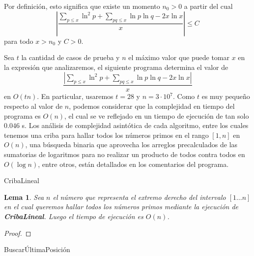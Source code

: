 \documentclass{article}
\DeclarePairedDelimiter\floor{\lfloor}{\rfloor}
\newtheorem{lemma}[theorem]{Lema}
\theoremstyle{definition}
\theoremstyle{remark}
\begin{document}
Por definici\'on, esto significa que existe un momento $n_0 > 0$ a partir del cual
$$\left|\frac{\sum_{p \leq x} \ln^2 p + \sum_{pq \leq x} \ln p \ln q - 2x\ln x}{x}\right| \leq C$$
para todo $x > n_0$ y $C > 0$.

Sea $t$ la cantidad de casos de prueba y $n$ el m\'aximo valor que puede tomar $x$ en la expresi\'on que analizaremos,
el siguiente programa determina el valor de 
$$\frac{|\sum_{p \leq x} \ln^2 p + \sum_{pq \leq x} \ln p \ln q - 2x\ln x|}{x}$$
en $O(tn)$. En particular, usaremos $t = 28$ y $n = 3 \cdot 10^7$. Como $t$ es muy peque\~no respecto al valor de $n$, podemos
considerar que la complejidad en tiempo del programa es $O(n)$, el cual se ve reflejado en un tiempo de ejecuci\'on
de tan solo $0.046$ s. Los an\'alisis de complejidad asint\'otica de cada algoritmo, entre los cuales tenemos una criba para
hallar todos los n\'umeros primos en el rango $[1, n]$ en $O(n)$, una b\'usqueda binaria que aprovecha los arreglos precalculados de las sumatorias
de logaritmos para no realizar un producto de todos contra todos en $O(\log n)$, entre otros, est\'an detallados en los comentarios del programa.

\begin{algorithm}[H]
\SetAlgoLined
\DontPrintSemicolon
{}
\caption{CribaLineal\label{CL}}
\end{algorithm}

\begin{lemma}
Sea $n$ el n\'umero que representa el extremo derecho del intervalo $[1 \dots n]$
en el cual queremos hallar todos los n\'umeros primos mediante la ejecuci\'on de \textbf{CribaLineal}. Luego el tiempo de ejecuci\'on es $O(n)$.
\end{lemma}

\begin{proof}
\end{proof}

\begin{algorithm}[H]
\SetAlgoLined
\DontPrintSemicolon
{}
\caption{Buscar\'UltimaPosici\'on\label{BUP}}
\end{algorithm}
\end{document}
